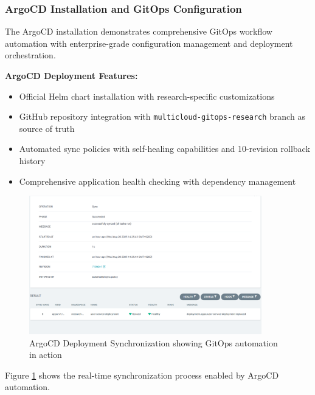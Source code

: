 \subsubsection{ArgoCD Installation and GitOps Configuration}

The ArgoCD installation demonstrates comprehensive GitOps workflow automation with enterprise-grade configuration management and deployment orchestration.

\textbf{ArgoCD Deployment Features:}
\begin{itemize}
\item Official Helm chart installation with research-specific customizations
\item GitHub repository integration with \texttt{multicloud-gitops-research} branch as source of truth
\item Automated sync policies with self-healing capabilities and 10-revision rollback history
\item Comprehensive application health checking with dependency management
\end{itemize}

\begin{figure}[H]
\centering
\includegraphics[width=0.9\textwidth]{figures/chapter5/argocd-deployment-sync.png}
\caption{ArgoCD Deployment Synchronization showing GitOps automation in action}
\label{fig:argocd-deployment-sync}
\end{figure}

Figure \ref{fig:argocd-deployment-sync} shows the real-time synchronization process enabled by ArgoCD automation.

